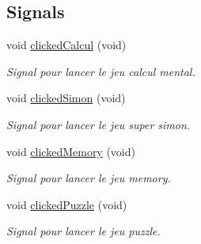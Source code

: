 \subsection*{Signals}
\begin{DoxyCompactItemize}
\item 
\mbox{\label{class_main_menu_a598cb53314acb8fc35b5f2312db6e561}} 
void \hyperlink{class_main_menu_a598cb53314acb8fc35b5f2312db6e561}{clicked\+Calcul} (void)
\begin{DoxyCompactList}\small\item\em Signal pour lancer le jeu calcul mental. \end{DoxyCompactList}\item 
\mbox{\label{class_main_menu_accfb16e9b9cbabbfd2460f8242648dd3}} 
void \hyperlink{class_main_menu_accfb16e9b9cbabbfd2460f8242648dd3}{clicked\+Simon} (void)
\begin{DoxyCompactList}\small\item\em Signal pour lancer le jeu super simon. \end{DoxyCompactList}\item 
\mbox{\label{class_main_menu_a68da1f9eb32fa5536326328c0dead36f}} 
void \hyperlink{class_main_menu_a68da1f9eb32fa5536326328c0dead36f}{clicked\+Memory} (void)
\begin{DoxyCompactList}\small\item\em Signal pour lancer le jeu memory. \end{DoxyCompactList}\item 
\mbox{\label{class_main_menu_ae89311117941bcf87470e5764106fed2}} 
void \hyperlink{class_main_menu_ae89311117941bcf87470e5764106fed2}{clicked\+Puzzle} (void)
\begin{DoxyCompactList}\small\item\em Signal pour lancer le jeu puzzle. \end{DoxyCompactList}\end{DoxyCompactItemize}
